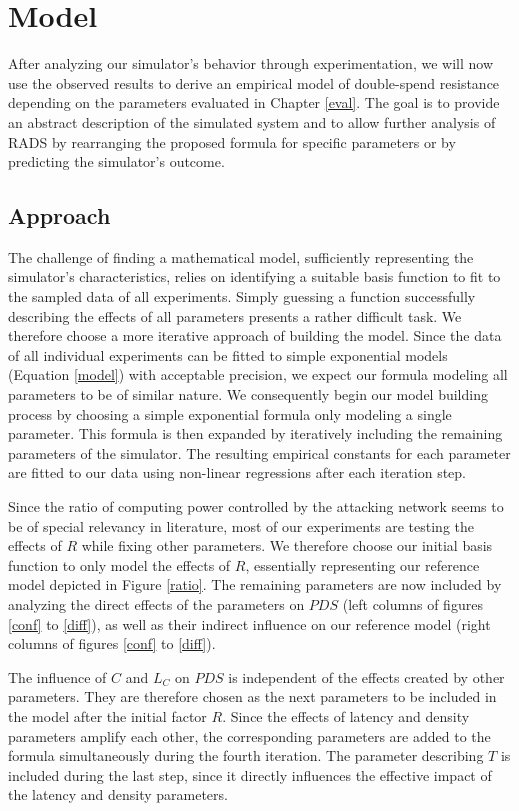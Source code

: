 \documentclass[a4paper,12pt,twoside]{report}
\begin{document}

\chapter{Model} \label{modelchapter}
After analyzing our simulator's behavior through experimentation, we will now use the observed results to derive an empirical model of double-spend resistance depending on the parameters evaluated in Chapter \ref{eval}. The goal is to provide an abstract description of the simulated system and to allow further analysis of RADS by rearranging the proposed formula for specific parameters or by predicting the simulator's outcome. 
\section{Approach}
The challenge of finding a mathematical model, sufficiently representing the simulator's characteristics, relies on identifying a suitable basis function to fit to the sampled data of all experiments. Simply guessing a function successfully describing the effects of all parameters presents a rather difficult task. We therefore choose a more iterative approach of building the model. Since the data of all individual experiments can be fitted to simple exponential models (Equation \ref{model}) with acceptable precision, we expect our formula modeling all parameters to be of similar nature. We consequently begin our model building process by choosing a simple exponential formula only modeling a single parameter. This formula is then expanded by iteratively including the remaining parameters of the simulator. The resulting empirical constants for each parameter are fitted to our data using non-linear regressions \cite{nlxb} after each iteration step. 

Since the ratio of computing power controlled by the attacking network seems to be of special relevancy in literature, most of our experiments are testing the effects of $R$ while fixing other parameters. We therefore choose our initial basis function to only model the effects of $R$, essentially representing our reference model depicted in Figure \ref{ratio}. The remaining parameters are now included by analyzing the direct effects of the parameters on $PDS$ (left columns of figures \ref{conf} to \ref{diff}), as well as their indirect influence on our reference model (right columns of figures \ref{conf} to \ref{diff}). 

The influence of $C$ and $L_C$ on $PDS$ is independent of the effects created by other parameters. They are therefore chosen as the next parameters to be included in the model after the initial factor $R$. Since the effects of latency and density parameters amplify each other, the corresponding parameters are added to the formula simultaneously during the fourth iteration. The parameter describing $T$ is included during the last step, since it directly influences the effective impact of the latency and density parameters.
\end{document}
